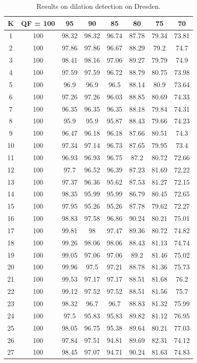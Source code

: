 \documentclass[review]{elsarticle}
\begin{document}
\begin{longtable}{c|ccccccc}
		\caption{Results on dilation detection on Dresden.}
		\label{table:dresdendilation}\\
		\hline\hline
		\textbf{K}&\textbf{QF = 100}&\textbf{95}&\textbf{90}&\textbf{85}&\textbf{80}&\textbf{75}&\textbf{70}\\
		\hline
		1&100&98.32&98.32&96.74&87.78&79.34&73.81\\
		2&100&97.86&97.86&96.67&88.29&79.2&74.7\\
		3&100&98.41&98.16&97.06&89.27&79.79&74.9\\
		4&100&97.59&97.59&96.72&88.79&80.75&73.98\\
		5&100&96.9&96.9&96.5&88.14&80.9&73.64\\
		6&100&97.26&97.26&96.03&88.85&80.69&74.33\\
		7&100&96.35&96.35&96.35&88.18&79.84&74.31\\
		8&100&95.9&95.9&95.87&88.43&79.66&74.23\\
		9&100&96.47&96.18&96.18&87.66&80.51&74.3\\
		10&100&97.34&97.14&96.73&87.65&79.95&73.4\\
		11&100&96.93&96.93&96.75&87.2&80.72&72.66\\
		12&100&97.7&96.52&96.39&87.23&81.69&72.22\\
		13&100&97.37&96.36&95.62&87.53&81.27&72.15\\
		14&100&98.35&95.99&95.99&86.79&80.45&72.65\\
		15&100&97.95&95.26&95.26&87.78&79.62&72.27\\
		16&100&98.83&97.58&96.86&90.24&80.21&75.01\\
		17&100&99.81&98&97.47&89.36&80.72&74.82\\
		18&100&99.26&98.06&98.06&88.43&81.13&74.74\\
		19&100&99.05&97.06&97.06&89.2&81.46&75.02\\
		20&100&99.96&97.5&97.21&88.78&81.36&75.73\\
		21&100&99.53&97.17&97.17&88.51&81.68&76.2\\
		22&100&99.12&97.52&97.52&88.51&81.56&75.7\\
		23&100&98.32&96.7&96.7&88.83&81.32&75.99\\
		24&100&97.5&95.83&95.83&89.82&81.12&76.95\\
		25&100&98.05&96.75&95.38&89.64&80.21&77.03\\
		26&100&97.84&97.51&94.81&89.69&82.31&74.12\\
		27&100&98.45&97.07&94.71&90.24&81.63&74.83\\

\end{longtable}
\end{document}
